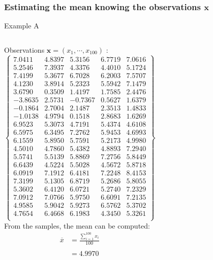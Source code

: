 \frame
{
\frametitle{Estimating the mean knowing the observations $\mathbf{x}$}

\begin{exampleblock}{Example A}
\begin{columns}
Observations $\mathbf{x}=(x_1,\cdots,x_{100})$ :
\tiny
$$
\left\lbrace
\begin{array}{ccccc}
   7.0411 &  4.8397 &  5.3156 &  6.7719 &  7.0616 \\
    5.2546 &   7.3937 &  4.3376 &   4.4010&    5.1724\\
    7.4199 &   5.3677 &  6.7028 &   6.2003 &   7.5707\\
    4.1230 &   3.8914 &   5.2323 &  5.5942 &    7.1479\\
  3.6790 &     0.3509 &   1.4197&   1.7585 &   2.4476\\
   -3.8635 &   2.5731 &   -0.7367 &  0.5627 &   1.6379\\
   -0.1864 &   2.7004 &   2.1487 &  2.3513 &   1.4833\\
   -1.0138 &  4.9794 &  0.1518 &  2.8683 &  1.6269 \\
    6.9523 & 5.3073 &  4.7191 &   5.4374 &   4.6108 \\
    6.5975 &  6.3495 & 7.2762 &  5.9453 &   4.6993\\
    6.1559&  5.8950 &  5.7591 &  5.2173 &   4.9980\\
    4.5010 &  4.7860 &  5.4382 &   4.8893&  7.2940\\
    5.5741 &  5.5139 &  5.8869 &  7.2756 &   5.8449 \\
    6.6439 &  4.5224 &  5.5028 &  4.5672 &  5.8718 \\
    6.0919 &  7.1912 &  6.4181 &  7.2248 &  8.4153 \\
    7.3199 &  5.1305 &  6.8719 &  5.2686 &   5.8055 \\
    5.3602 &  6.4120 &  6.0721 &  5.2740 &  7.2329\\
    7.0912 &  7.0766 &  5.9750 &  6.6091 &  7.2135 \\
    4.9585 &  5.9042 &  5.9273 &  6.5762 &   5.3702\\
    4.7654 &  6.4668 &  6.1983 &  4.3450 &   5.3261\\
\end{array}\right\rbrace
$$
\normalsize
From the samples, the mean can be computed:
$$
\begin{array}{ll}
\overline{x}&=\frac{\sum_{i=1}^{100}x_i}{100}\\
&\\
&=  4.9970\\
\end{array}
$$
\end{columns}
\end{exampleblock}
}


